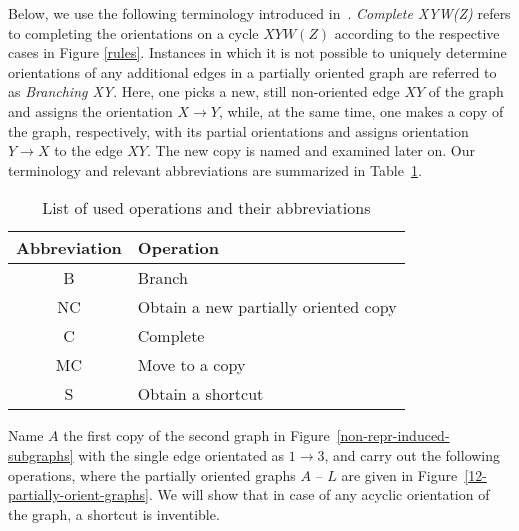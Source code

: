 \documentclass[12pt]{article}
\numberwithin{equation}{section}
\begin{document}
Below,  we use the following terminology introduced in~\cite{Akrobotu}. \emph{Complete XYW(Z)} refers to completing the orientations on a cycle $XYW(Z)$ according to the respective cases in Figure \ref{rules}. Instances in which it is not possible
to uniquely determine orientations of any additional edges in a partially oriented graph
are referred to as \emph{Branching XY}. Here, one picks a new, still non-oriented edge
$XY$ of the graph and assigns the orientation $X\rightarrow Y$, while, at the
same time, one makes a copy of the graph, respectively, with its partial orientations
and assigns orientation $Y\rightarrow X$ to the edge $XY$. The new copy is named and examined
later on. Our terminology and relevant abbreviations are
summarized in Table~\ref{table1}.

\begin{table}[h!]
\centering
\begin{tabular}{|c|l|}
\hline
{\bf Abbreviation} & {\bf Operation} \\
\hline
B & Branch \\
NC & Obtain a new partially oriented copy \\
C & Complete \\
MC & Move to a copy \\
S & Obtain a shortcut\index{shortcut} \\

\hline
\end{tabular}
\caption{List of used operations and their abbreviations}
\label{table1}
\end{table}

Name $A$ the first copy of the second graph in Figure~\ref{non-repr-induced-subgraphs} with the single edge orientated as $1\rightarrow 3$, and carry out the following operations, where the  partially oriented graphs $A$ -- $L$ are given in Figure~\ref{12-partially-orient-graphs}. We will show that in case of any acyclic orientation of the graph, a shortcut is inventible.
\end{document}
